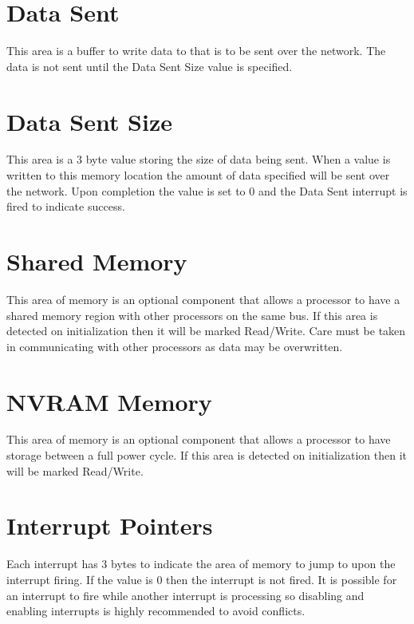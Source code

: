 \section{Data Sent}

This area is a buffer to write data to that is to be sent over the network. The data is not sent until the Data Sent Size value is specified.




\section{Data Sent Size}

This area is a 3 byte value storing the size of data being sent. When a value is written to this memory location the amount of data specified will be sent over the network. Upon completion the value is set to 0 and the Data Sent interrupt is fired to indicate success.




\section{Shared Memory}

This area of memory is an optional component that allows a processor to have a shared memory region with other processors on the same bus. If this area is detected on initialization then it will be marked Read/Write. Care must be taken in communicating with other processors as data may be overwritten.




\section{NVRAM Memory}

This area of memory is an optional component that allows a processor to have storage between a full power cycle. If this area is detected on initialization then it will be marked Read/Write.




\section{Interrupt Pointers}

Each interrupt has 3 bytes to indicate the area of memory to jump to upon the interrupt firing. If the value is 0 then the interrupt is not fired. It is possible for an interrupt to fire while another interrupt is processing so disabling and enabling interrupts is highly recommended to avoid conflicts.





